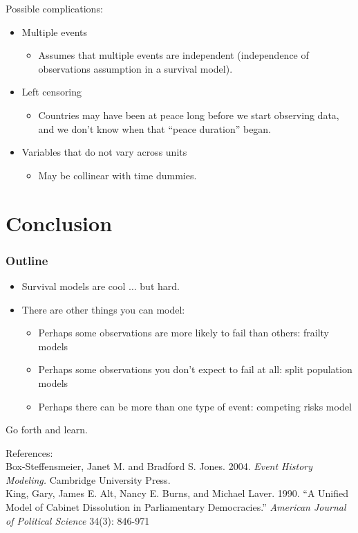 \documentclass{beamer}
\begin{document}
\begin{frame}
Possible complications:
\pause
\begin{itemize}
\item Multiple events
\pause
\begin{itemize}
\item Assumes that multiple events are independent (independence of
observations assumption in a survival model).
\end{itemize}
\pause
\item Left censoring
\pause 
\begin{itemize}
\item Countries may have been at peace long before we start observing
data, and we don't know when that ``peace duration'' began.
\end{itemize}
\pause
\item Variables that do not vary across units
\pause
\begin{itemize}
\item May be collinear with time dummies.
\end{itemize}
\end{itemize}
\end{frame}

\section{Conclusion}


\begin{frame}
\frametitle{Outline}
\tableofcontents[currentsection]
\end{frame}

\begin{frame}
\begin{itemize}
\item Survival models are cool $\dots$ \pause but hard.
\pause
\item There are other things you can model:
\pause
\begin{itemize}
\item Perhaps some observations are more likely to fail
than others: frailty models
\pause
\item Perhaps some observations you don't expect to fail at all: split
population models
\pause
\item Perhaps there can be more than one type of event: competing
risks model
\end{itemize}
\pause
\end{itemize}
Go forth and learn.
\end{frame}

\begin{frame}
References:\\
\bigskip
Box-Steffensmeier, Janet M. and Bradford S. Jones.  2004. \emph{Event
History Modeling.} Cambridge University Press.\\
\bigskip
King, Gary, James E. Alt, Nancy E. Burns, and Michael Laver.  1990.
``A Unified Model of Cabinet Dissolution in Parliamentary
Democracies.''  \emph{American Journal of Political Science} 34(3): 846-971
\end{frame}
\end{document}
